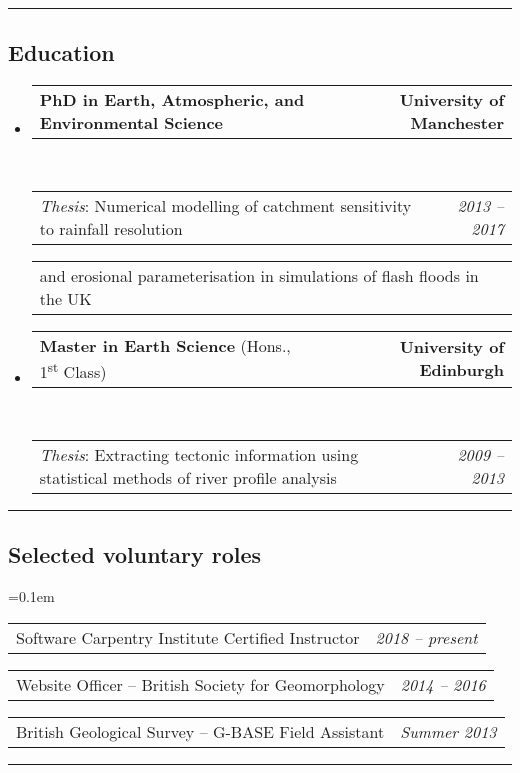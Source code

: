 \documentclass[10.5pt,a4]{article}
\makeatletter
\newcommand{\headerrow}[2]
{\begin{tabular*}{\linewidth}{l@{\extracolsep{\fill}}r}
	#1 &
	#2 \\
\end{tabular*}}
\makeatother
\begin{document}
\hrule
\vspace{-0.4em}
\subsection*{Education}
\begin{itemize}
	\parskip=0.1em
	
	\item 
	\headerrow
		{\textbf{PhD in Earth, Atmospheric, and Environmental Science}}
		{\textbf{University of Manchester}}
	\\
	\headerrow
		{\emph{Thesis}: Numerical modelling of catchment sensitivity to rainfall resolution}
		{\emph{2013 -- 2017}}
	\headerrow
		{\hspace{10mm} and erosional parameterisation in simulations of flash floods in the UK}
		{}
  
	\item 
	\headerrow
		{\textbf{Master in Earth Science} (Hons., 1\textsuperscript{st} Class) }
		{\textbf{University of Edinburgh}}
	\\
	\headerrow
		{\emph{Thesis}: Extracting tectonic information using statistical methods of river profile analysis}
		{\emph{2009 -- 2013}}
\end{itemize}

\hrule
\vspace{-0.4em}
\subsection*{Selected voluntary roles}
	\parskip=0.1em
\begin{itemize*}
	\item
	\headerrow
	  {Software Carpentry Institute Certified Instructor}
	  {\textit{2018 -- present}}
	  
	\item
	\headerrow
	  {Website Officer -- British Society for Geomorphology}
	  {\textit{2014 -- 2016}}

	\item
	\headerrow
	  {British Geological Survey -- G-BASE Field Assistant}
	  {\textit{Summer 2013}}
\end{itemize*}

\hrule
\vspace{-0.4em}
\end{document}
